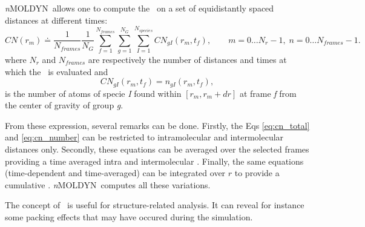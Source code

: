 \documentclass[a4paper,11pt]{report}
\newcommand{\NMOLDYN}{\textit{n}MOLDYN}
\begin{document}
\NMOLDYN\ allows one to compute the \CN\ on a set of equidistantly spaced distances at different times:
\begin{equation}
\label{eq:cn_total}
CN(r_m) \doteq \frac{1}{N_{frames}}\frac{1}{N_{G}}\sum_{f=1}^{N_{frames}}\sum_{g=1}^{N_{G}}\sum_{I=1}^{N_{species}} CN_{gI}(r_m, t_f),
\qquad m = 0\ldots N_r - 1,\; n = 0\ldots N_{frames} - 1.
\end{equation}
where $N_r$ and $N_{frames}$ are respectively the number of distances and times at which the \CN\ is evaluated and
\begin{equation}
\label{eq:cn_number}
CN_{gI}(r_m, t_f) = n_{gI}(r_m, t_f),
\end{equation}
is the number of atoms of specie \textit{I} found within $[r_m,r_m + dr]$ at frame \textit{f} from the center of gravity of group \textit{g}.

From these expression, several remarks can be done. Firstly, the Eqs \ref{eq:cn_total} and \ref{eq:cn_number} can be restricted 
to intramolecular and intermolecular distances only. Secondly, these equations can be averaged over the selected frames providing a time averaged intra and intermolecular 
\CN . Finally, the same equations (time-dependent and time-averaged) can be integrated over $r$ to provide a 
cumulative \CN . \NMOLDYN\ computes all these variations. 

The concept of \CN\ is useful for structure-related analysis. It can reveal for instance some packing effects that may have 
occured during the simulation.
\end{document}
